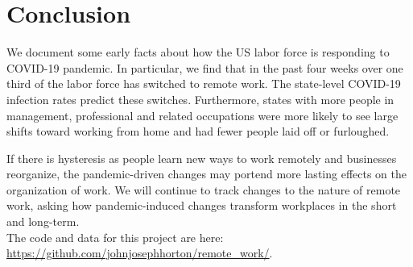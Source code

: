 \documentclass[12pt]{article}
\begin{document}



\section{Conclusion}
We document some early facts about how the US labor force is responding to COVID-19 pandemic.  In particular, we find that in the past four weeks over one third of the labor force has switched to remote work. The state-level COVID-19 infection rates predict these switches. Furthermore, states with more people in management, professional and related occupations were more likely to see large shifts toward working from home and had fewer people laid off or furloughed. 

If there is hysteresis as people learn new ways to work remotely and businesses reorganize, the pandemic-driven changes may portend more lasting effects on the organization of work.
We will continue to track changes to the nature of remote work, asking how pandemic-induced changes transform workplaces in the short and long-term. \\

\noindent The code and data for this project are here:
\href{https://github.com/johnjosephhorton/remote\_work/}{https://github.com/johnjosephhorton/remote\_work/}.


\newpage \clearpage


\end{document}
